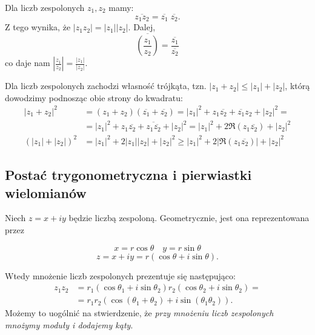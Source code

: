 \begin{lemma}
  Dla liczb zespolonych $z_1,z_2$ mamy:
  $$\overline{z_1z_2}=\overline{z_1}\;\overline{z_2}.$$
  Z tego wynika, że $|z_1z_2|=|z_1||z_2|$. Dalej,
  $$\overline{\left(\frac{z_1}{z_2}\right)}=\frac{\overline{z_1}}{\overline{z_2}}$$
  co daje nam $\left|\frac{z_1}{z_2}\right|=\frac{|z_1|}{|z_2|}$.
\end{lemma}

Dla liczb zespolonych zachodzi własność trójkąta, tzn. $|z_1+z_2|\leq |z_1|+|z_2|$, którą dowodzimy podnosząc obie strony do kwadratu:
\begin{align*}
  |z_1+z_2|^2&=(z_1+z_2)(\overline{z_1}+\overline{z_2})=|z_1|^2+z_1\overline{z_2}+\overline{z_1}z_2+|z_2|^2=\\ 
             &=|z_1|^2+z_1\overline{z_2}+\overline{z_1\overline{z_2}}+|z_2|^2=|z_1|^2+2\Re(z_1\overline{z_2})+|z_2|^2\\ 
  (|z_1|+|z_2|)^2&=|z_1|^2+2|z_1||z_2|+|z_2|^2\geq|z_1|^2+2|\Re(z_1\overline{z_2})|+|z_2|^2
\end{align*}

\subsection{Postać trygonometryczna i pierwiastki wielomianów}

\begin{definition}
  Niech $z=x+iy$ będzie liczbą zespoloną. Geometrycznie, jest ona reprezentowana przez

  \begin{center}
  \end{center}

  $$x=r\cos \theta\quad y=r\sin \theta$$
  $$z=x+iy=r(\cos \theta+i\sin \theta).$$
\end{definition}
Wtedy mnożenie liczb zespolonych prezentuje się następująco:
\begin{align*}
  z_1z_2&=r_1(\cos\theta_1+i\sin\theta_2)r_2(\cos\theta_2+i\sin\theta_2)=\\ 
        &=r_1r_2(\cos(\theta_1+\theta_2)+i\sin(\theta_1\theta_2)).
\end{align*}
Możemy to uogólnić na stwierdzenie, że \emph{przy mnożeniu liczb zespolonych mnożymy moduły i dodajemy kąty}.

